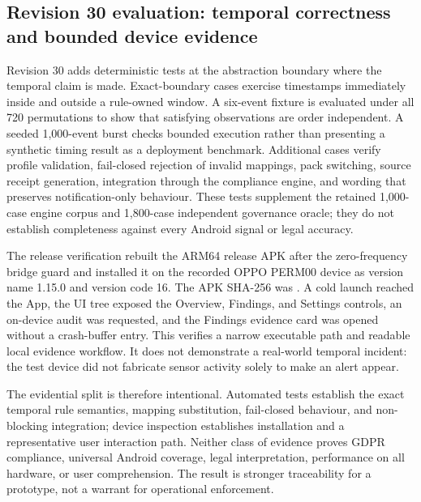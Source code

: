 

\subsection{Revision 30 evaluation: temporal correctness and bounded device evidence}

Revision 30 adds deterministic tests at the abstraction boundary where the temporal claim is made. Exact-boundary cases exercise timestamps immediately inside and outside a rule-owned window. A six-event fixture is evaluated under all 720 permutations to show that satisfying observations are order independent. A seeded 1,000-event burst checks bounded execution rather than presenting a synthetic timing result as a deployment benchmark. Additional cases verify profile validation, fail-closed rejection of invalid mappings, pack switching, source receipt generation, integration through the compliance engine, and wording that preserves notification-only behaviour. These tests supplement the retained 1,000-case engine corpus and 1,800-case independent governance oracle; they do not establish completeness against every Android signal or legal accuracy.

The release verification rebuilt the ARM64 release APK after the zero-frequency bridge guard and installed it on the recorded OPPO PERM00 device as version name 1.15.0 and version code 16. The APK SHA-256 was \texttt{}. A cold launch reached the App, the UI tree exposed the Overview, Findings, and Settings controls, an on-device audit was requested, and the Findings evidence card was opened without a crash-buffer entry. This verifies a narrow executable path and readable local evidence workflow. It does not demonstrate a real-world temporal incident: the test device did not fabricate sensor activity solely to make an alert appear.

The evidential split is therefore intentional. Automated tests establish the exact temporal rule semantics, mapping substitution, fail-closed behaviour, and non-blocking integration; device inspection establishes installation and a representative user interaction path. Neither class of evidence proves GDPR compliance, universal Android coverage, legal interpretation, performance on all hardware, or user comprehension. The result is stronger traceability for a prototype, not a warrant for operational enforcement.
